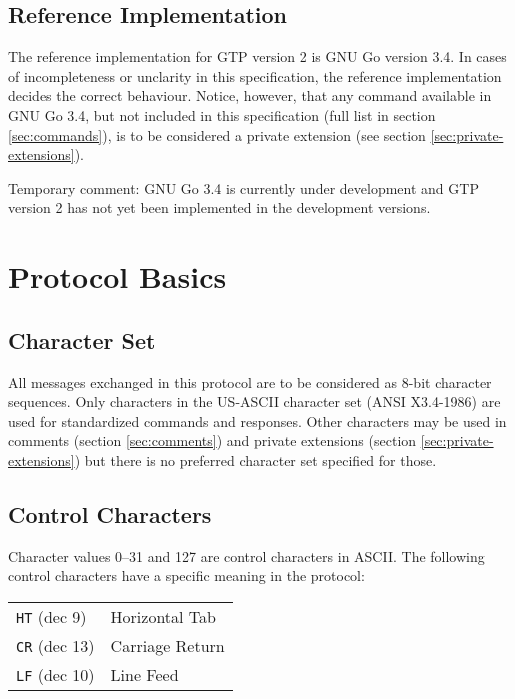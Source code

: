 \documentclass[a4paper]{article}
\begin{document}
\subsection{Reference Implementation}
The reference implementation for GTP version 2 is GNU Go version 3.4.
In cases of incompleteness or unclarity in this specification, the
reference implementation decides the correct behaviour. Notice,
however, that any command available in GNU Go 3.4, but not included in
this specification (full list in section \ref{sec:commands}), is to be
considered a private extension (see section
\ref{sec:private-extensions}).

Temporary comment: GNU Go 3.4 is currently under development and GTP
version 2 has not yet been implemented in the development versions.

\newpage
\section{Protocol Basics}

\subsection{Character Set}
\label{sec:character-set}
All messages exchanged in this protocol are to be considered as 8-bit
character sequences. Only characters in the US-ASCII character set
(ANSI X3.4-1986) are used for standardized commands and responses.
Other characters may be used in comments (section \ref{sec:comments})
and private extensions (section \ref{sec:private-extensions}) but
there is no preferred character set specified for those.

\subsection{Control Characters}
Character values 0--31 and 127 are control characters in ASCII. The
following control characters have a specific meaning in the
protocol:\\

\begin{tabular}{ll}
\texttt{HT} (dec 9)   &  Horizontal Tab \\
\texttt{CR} (dec 13)  &  Carriage Return \\
\texttt{LF} (dec 10)  &  Line Feed \\
\end{tabular}\\
\end{document}
